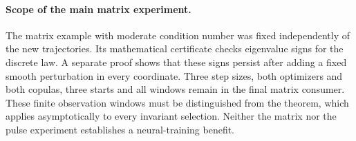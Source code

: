 \paragraph{Scope of the main matrix experiment.}
The matrix example with moderate condition number was fixed independently
of the new trajectories. Its mathematical certificate checks eigenvalue
signs for the discrete law. A separate proof shows that these signs
persist after adding a fixed smooth perturbation in every coordinate. Three step sizes, both optimizers and both copulas,
three starts and all windows remain in the final matrix consumer.
These finite observation windows must be distinguished from the theorem,
which applies asymptotically to every invariant selection. Neither the
matrix nor the pulse experiment establishes a neural-training benefit.
